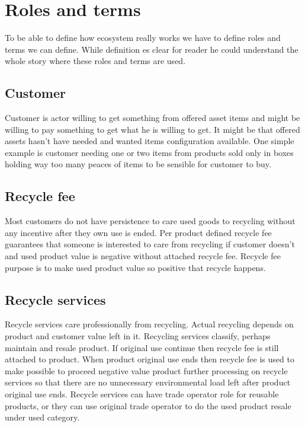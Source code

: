 \section{Roles and terms}
\label{roles_and_terms}
To be able to define how ecosystem really works we have to define roles and terms we can define. While definition es clear for reader he could understand the whole story where these roles and terms are used.

\subsection{Customer}
\label{customer}
Customer is actor willing to get something from offered asset items and might be willing to pay something to get what he is willing to get. It might be that offered assets hasn't have needed and wanted items configuration available. One simple example is customer needing one or two items from products sold only in boxes holding way too many peaces of items to be sensible for customer to buy.

\subsection{Recycle fee}
\label{recycle_fee}
Most customers do not have persistence to care used goods to recycling without any incentive after they own use is ended. Per product defined recycle fee guarantees that someone is interested to care from recycling if customer doesn't and used product value is negative without attached recycle fee. Recycle fee purpose is to make used product value so positive that recycle happens.

\subsection{Recycle services}
\label{recycle_services}
Recycle services care professionally from recycling. Actual recycling depends on product and customer value left in it. Recycling services classify, perhaps maintain and resale product. If original use continue then recycle fee is still attached to product. When product original use ends then recycle fee is used to make possible to proceed negative value product further processing on recycle services so that there are no unnecessary environmental load left after product original use ends. Recycle services can have trade operator role for reusable products, or they can use original trade operator to do the used product resale under used category.

